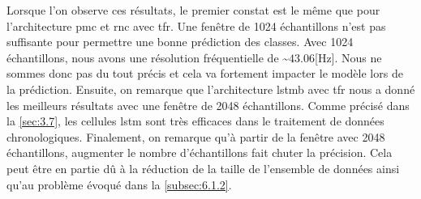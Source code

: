 \begin{table}[H]
\end{table}

Lorsque l'on observe ces résultats, le premier constat est le même que pour l'architecture \gls{pmc} et \gls{rnc} avec \gls{tfr}. Une fenêtre de 1024 échantillons n'est pas suffisante pour permettre une bonne prédiction des classes. Avec 1024 échantillons, nous avons une résolution fréquentielle de \textasciitilde$43.06$[Hz]. Nous ne sommes donc pas du tout précis et cela va fortement impacter le modèle lors de la prédiction. Ensuite, on remarque que l'architecture \gls{lstmb} avec \gls{tfr} nous a donné les meilleurs résultats avec une fenêtre de 2048 échantillons. Comme précisé dans la \autoref{sec:3.7}, les cellules \gls{lstm} sont très efficaces dans le traitement de données chronologiques. Finalement, on remarque qu'à partir de la fenêtre avec 2048 échantillons, augmenter le nombre d'échantillons fait chuter la précision. Cela peut être en partie dû à la réduction de la taille de l'ensemble de données ainsi qu'au problème évoqué dans la \autoref{subsec:6.1.2}. 

